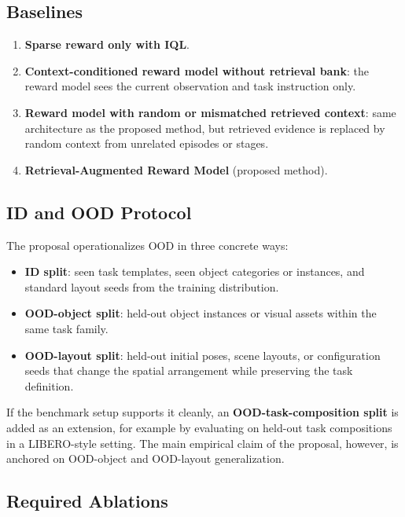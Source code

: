 \subsection{Baselines}

\begin{enumerate}
  \item \textbf{Sparse reward only with IQL}.
  \item \textbf{Context-conditioned reward model without retrieval bank}: the reward model sees the current observation and task instruction only.
  \item \textbf{Reward model with random or mismatched retrieved context}: same architecture as the proposed method, but retrieved evidence is replaced by random context from unrelated episodes or stages.
  \item \textbf{Retrieval-Augmented Reward Model} (proposed method).
\end{enumerate}

\subsection{ID and OOD Protocol}

The proposal operationalizes OOD in three concrete ways:
\begin{itemize}
  \item \textbf{ID split}: seen task templates, seen object categories or instances, and standard layout seeds from the training distribution.
  \item \textbf{OOD-object split}: held-out object instances or visual assets within the same task family.
  \item \textbf{OOD-layout split}: held-out initial poses, scene layouts, or configuration seeds that change the spatial arrangement while preserving the task definition.
\end{itemize}

If the benchmark setup supports it cleanly, an \textbf{OOD-task-composition split} is added as an extension,
for example by evaluating on held-out task compositions in a LIBERO-style setting.
The main empirical claim of the proposal, however, is anchored on OOD-object and OOD-layout generalization.

\subsection{Required Ablations}

